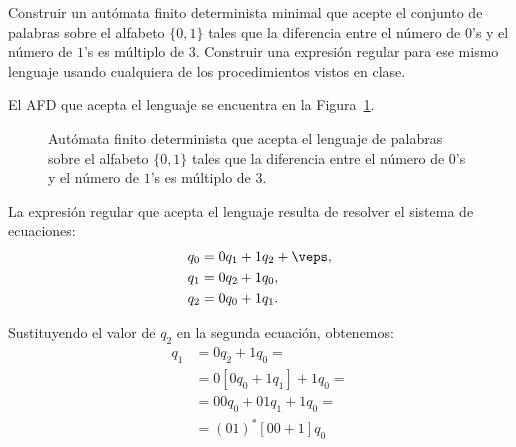 \documentclass[12pt]{article}
\begin{document}
    \begin{ejercicio}[2.5 puntos]
        Construir un autómata finito determinista minimal que acepte el conjunto de palabras sobre el alfabeto $\{0, 1\}$ tales que la diferencia entre el número de $0$'s y el número de $1$'s es múltiplo de $3$. Construir una expresión regular para ese mismo lenguaje usando cualquiera de los procedimientos vistos en clase.

        El AFD que acepta el lenguaje se encuentra en la Figura~\ref{fig:afd}.
        \begin{figure}
            \centering
            \caption{Autómata finito determinista que acepta el lenguaje de palabras sobre el alfabeto $\{0, 1\}$ tales que la diferencia entre el número de $0$'s y el número de $1$'s es múltiplo de $3$.}
            \label{fig:afd}
        \end{figure}

        La expresión regular que acepta el lenguaje resulta de resolver el sistema de ecuaciones:
        \begin{equation*}
            \begin{aligned}
                q_0 &= 0q_1 + 1q_2 + \veps, \\
                q_1 &= 0q_2 + 1q_0, \\
                q_2 &= 0q_0 + 1q_1.
            \end{aligned}
        \end{equation*}

        Sustituyendo el valor de $q_2$ en la segunda ecuación, obtenemos:
        \begin{align*}
            q_1 &= 0q_2 + 1q_0
            =\\&= 0[0q_0 + 1q_1] + 1q_0
            =\\&= 00q_0 + 01q_1 + 1q_0
            =\\&= (01)^*[00+1]q_0
        \end{align*}


\end{ejercicio}
\end{document}
